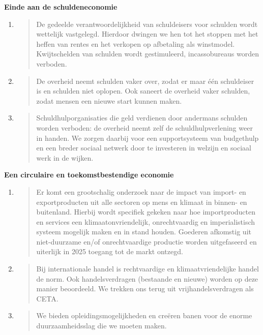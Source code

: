 \textbf{Einde aan de schuldeneconomie}

\begin{enumerate}
\def\labelenumi{\arabic{enumi}.}
\item
  \begin{quote}
  De gedeelde verantwoordelijkheid van schuldeisers voor schulden wordt
  wettelijk vastgelegd. Hierdoor dwingen we hen tot het stoppen met het
  heffen van rentes en het verkopen op afbetaling als winstmodel.
  Kwijtschelden van schulden wordt gestimuleerd, incassobureaus worden
  verboden.
  \end{quote}
\item
  \begin{quote}
  De overheid neemt schulden vaker over, zodat er maar één schuldeiser
  is en schulden niet oplopen. Ook saneert de overheid vaker schulden,
  zodat mensen een nieuwe start kunnen maken.
  \end{quote}
\item
  \begin{quote}
  Schuldhulporganisaties die geld verdienen door andermans schulden
  worden verboden: de overheid neemt zelf de schuldhulpverlening weer in
  handen. We zorgen daarbij voor een supportsysteem van budgethulp en
  een breder sociaal netwerk door te investeren in welzijn en sociaal
  werk in de wijken.
  \end{quote}
\end{enumerate}

\textbf{Een circulaire en toekomstbestendige economie}

\begin{enumerate}
\def\labelenumi{\arabic{enumi}.}
\item
  \begin{quote}
  Er komt een grootschalig onderzoek naar de impact van import- en
  exportproducten uit alle sectoren op mens en klimaat in binnen- en
  buitenland. Hierbij wordt specifiek gekeken naar hoe importproducten
  en services een klimaatonvriendelijk, onrechtvaardig en
  imperialistisch systeem mogelijk maken en in stand houden. Goederen
  afkomstig uit niet-duurzame en/of onrechtvaardige productie worden
  uitgefaseerd en uiterlijk in 2025 toegang tot de markt ontzegd.
  \end{quote}
\item
  \begin{quote}
  Bij internationale handel is rechtvaardige en klimaatvriendelijke
  handel de norm. Ook handelsverdragen (bestaande en nieuwe) worden op
  deze manier beoordeeld. We trekken ons terug uit vrijhandelsverdragen
  als CETA.
  \end{quote}
\item
  \begin{quote}
  We bieden opleidingsmogelijkheden en creëren banen voor de enorme
  duurzaamheidsslag die we moeten maken.
  \end{quote}
\end{enumerate}


